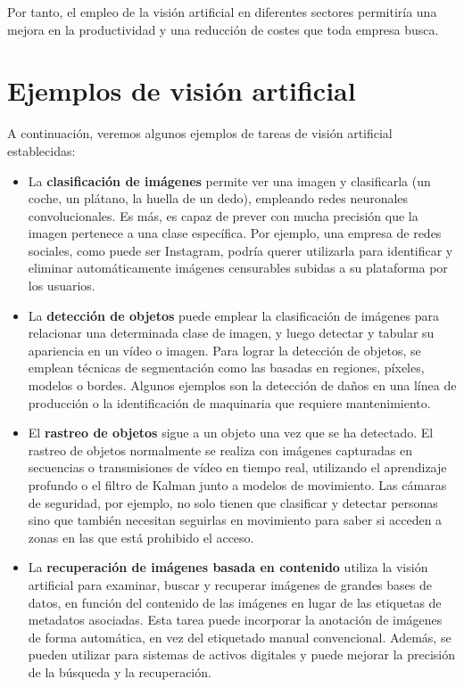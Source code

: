 Por tanto, el empleo de la visión artificial en diferentes sectores permitiría una mejora en la productividad y una reducción de costes que toda empresa busca. \cite{beneficios}




\section{Ejemplos de visión artificial}
A continuación, veremos algunos ejemplos de tareas de visión artificial establecidas:
\begin{itemize}
    \item La \textbf{clasificación de imágenes} permite ver una imagen y clasificarla (un coche, un plátano, la huella de un dedo), empleando redes neuronales convolucionales. Es más, es capaz de prever con mucha precisión que la imagen pertenece a una clase específica. Por ejemplo, una empresa de redes sociales, como puede ser Instagram, podría querer utilizarla para identificar y eliminar automáticamente imágenes censurables subidas a su plataforma por los usuarios.
    \item La \textbf{detección de objetos} puede emplear la clasificación de imágenes para relacionar una determinada clase de imagen, y luego detectar y tabular su apariencia en un vídeo o imagen. Para lograr la detección de objetos, se emplean técnicas de segmentación como las basadas en regiones, píxeles, modelos o bordes. Algunos ejemplos son la detección de daños en una línea de producción o la identificación de maquinaria que requiere mantenimiento.
    \item El \textbf{rastreo de objetos} sigue a un objeto una vez que se ha detectado. El rastreo de objetos normalmente se realiza con imágenes capturadas en secuencias o transmisiones de vídeo en tiempo real, utilizando el aprendizaje profundo o el filtro de Kalman junto a modelos de movimiento. Las cámaras de seguridad, por ejemplo, no solo tienen que clasificar y detectar personas sino que también necesitan seguirlas en movimiento para saber si acceden a zonas en las que está prohibido el acceso. \cite{rastreo}
    \item La \textbf{recuperación de imágenes basada en contenido} utiliza la visión artificial para examinar, buscar y recuperar imágenes de grandes bases de datos, en función del contenido de las imágenes en lugar de las etiquetas de metadatos asociadas. Esta tarea puede incorporar la anotación de imágenes de forma automática, en vez del etiquetado manual convencional. Además, se pueden utilizar para sistemas de activos digitales y puede mejorar la precisión de la búsqueda y la recuperación.
\end{itemize}

